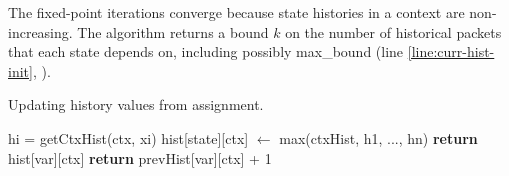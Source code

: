 The fixed-point iterations converge because state histories in a context are
non-increasing. The algorithm returns a bound $k$ on the number of historical
packets that each state depends on, including possibly max\_bound (line
\ref{line:curr-hist-init}, ).




\begin{algorithm}
  \caption{Updating history values from assignment.}
  \label{alg:update-hist}
  \begin{algorithmic}[1]
    \label{line:used-var-start}
    \State hi = {\sc getCtxHist}(ctx, xi)
    \EndFor\label{line:used-var-end}
    \State hist[state][ctx] $\gets$ max(ctxHist, h1, ...,
    hn) \label{line:assign-max-hist}
    \EndFunction
    \State \textbf{return} hist[var][ctx] \label{line:current-history-returned}
    \State \textbf{return} prevHist[var][ctx] + 1  \label{line:older-history-returned}
    \EndIf
    \EndFunction
  \end{algorithmic}
\end{algorithm}

